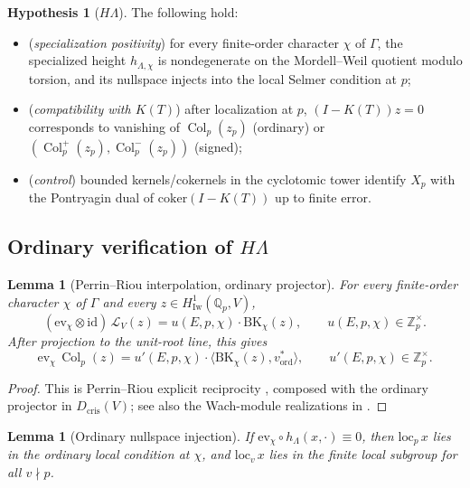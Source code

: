 \documentclass[12pt,reqno]{amsart}
\newtheorem{lemma}[theorem]{Lemma}
\theoremstyle{definition}
\newtheorem{hypothesis}[theorem]{Hypothesis}
\theoremstyle{remark}
\newcommand{\Qp}{\mathbb{Q}_p}
\newcommand{\Zp}{\mathbb{Z}_p}
\newcommand{\Lam}{\Lambda}
\DeclareMathOperator{\Col}{Col}
\begin{document}
\begin{hypothesis}[$H\Lambda$]\label{hyp:Hlambda}
The following hold:
\begin{itemize}
\item[(H1)] (\emph{specialization positivity}) for every finite-order character $\chi$ of $\Gamma$, the specialized height $h_{\Lam,\chi}$ is nondegenerate on the Mordell--Weil quotient modulo torsion, and its nullspace injects into the local Selmer condition at $p$;
\item[(H2)] (\emph{compatibility with $K(T)$}) after localization at $p$, $(I-K(T))z=0$ corresponds to vanishing of $\Col_p(z_p)$ (ordinary) or $(\Col_p^+(z_p),\Col_p^-(z_p))$ (signed);
\item[(H3)] (\emph{control}) bounded kernels/cokernels in the cyclotomic tower identify $X_p$ with the Pontryagin dual of $\mathrm{coker}(I-K(T))$ up to finite error.
\end{itemize}
\end{hypothesis}

\subsection{Ordinary verification of $H\Lam$}

\begin{lemma}[Perrin--Riou interpolation, ordinary projector]\label{lem:HL-specialization-ord}
For every finite-order character $\chi$ of $\Gamma$ and every $z\in H^1_{\mathrm{Iw}}(\Qp,V)$,
\[
(\mathrm{ev}_\chi\otimes\mathrm{id})\,\mathcal L_V(z)
=u(E,p,\chi)\cdot \mathrm{BK}_\chi(z),\qquad u(E,p,\chi)\in\Zp^\times.
\]
After projection to the unit-root line, this gives
\[
\mathrm{ev}_\chi\,\Col_p(z)=u'(E,p,\chi)\cdot\langle \mathrm{BK}_\chi(z),v_{\mathrm{ord}}^*\rangle,\qquad u'(E,p,\chi)\in\Zp^\times.
\]
\end{lemma}

\begin{proof}
This is Perrin--Riou explicit reciprocity \cite{PR94,PR95}, composed with the ordinary projector in $D_{\mathrm{cris}}(V)$; see also the Wach-module realizations in \cite{Berger,CC}.
\end{proof}

\begin{lemma}[Ordinary nullspace injection]\label{lem:HL-nullspace-ord}
If $\mathrm{ev}_\chi\circ h_\Lam(x,\cdot)\equiv 0$, then $\mathrm{loc}_p\,x$ lies in the ordinary local condition at $\chi$, and $\mathrm{loc}_v\,x$ lies in the finite local subgroup for all $v\nmid p$.
\end{lemma}
\end{document}
